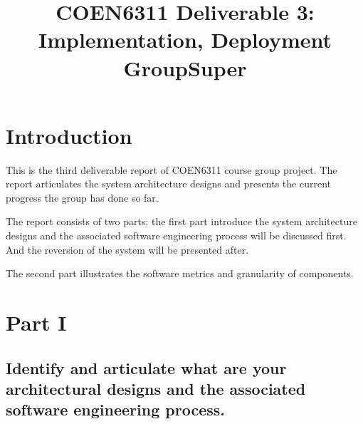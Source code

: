 \documentclass[conference]{IEEEtran}
\begin{document}
\title{COEN6311 Deliverable 3: \\
	Implementation, Deployment\\
	GroupSuper
}

\author{
	\and
	\and

}

\maketitle

\section{Introduction}

This is the third deliverable report of COEN6311 course group project.
The report articulates the system architecture designs and presents the current progress the group has done so far.

The report consists of two parts:
the first part introduce the system architecture designs and the associated software engineering process will be discussed first.
And the reversion of the system will be presented after.

The second part illustrates the software metrics and granularity of components.

\section{Part I}

\subsection{Identify and articulate what are your architectural designs and the associated
	software engineering process.
}
\label{sec:1.1}
\end{document}

